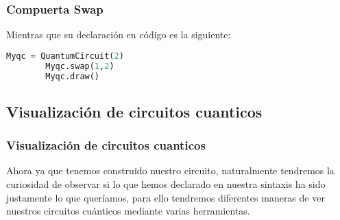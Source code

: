 \documentclass[spanish]{beamer}
\begin{document}
     \newpage\begin{frame}[fragile]
     \frametitle{Compuerta Swap}
    Mientras que su declaración en código es la siguiente:
     
      \begin{lstlisting}[language=Python]
        Myqc = QuantumCircuit(2)
        Myqc.swap(1,2)
        Myqc.draw() \end{lstlisting}
    \end{frame}  
\newpage\subsection{Visualización de circuitos cuanticos}
 \setlength{\parskip}{0.5mm}
 \justify
  \begin{frame}
   \frametitle{Visualización de circuitos cuanticos} 
Ahora ya que tenemos construido nuestro circuito, naturalmente tendremos la curiosidad de observar si lo que hemos declarado en nuestra sintaxis ha sido justamente lo que queríamos, para ello tendremos diferentes maneras de ver nuestros circuitos cuánticos mediante varias herramientas.
 \end{frame}
 
\end{document}
